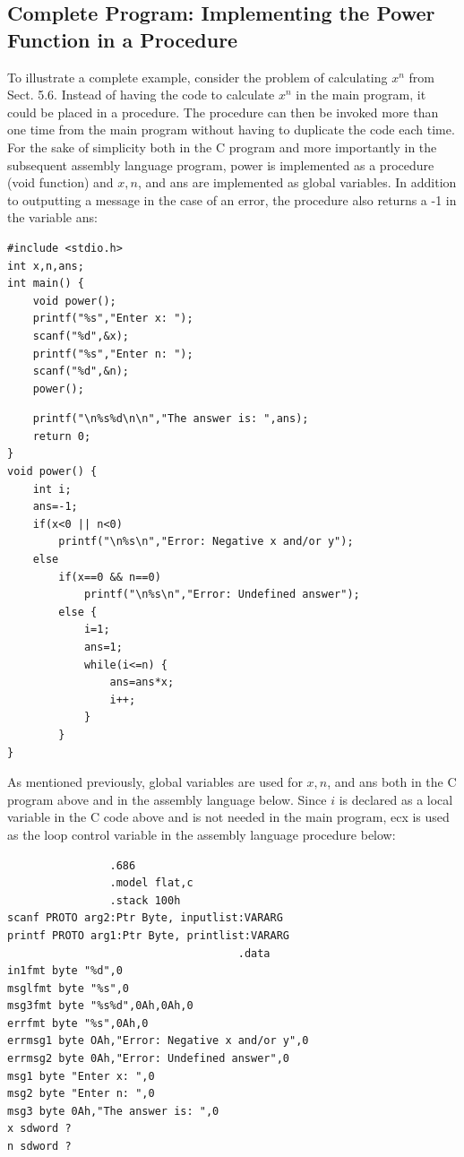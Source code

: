 \documentclass[10pt]{book}
\begin{document}
\subsection{Complete Program: Implementing the Power Function in a Procedure}
To illustrate a complete example, consider the problem of calculating $x^{n}$ from Sect. 5.6. Instead of having the code to calculate $x^{n}$ in the main program, it could be placed in a procedure. The procedure can then be invoked more than one time from the main program without having to duplicate the code each time. For the sake of simplicity both in the C program and more importantly in the subsequent assembly language program, power is implemented as a procedure (void function) and $x, n$, and ans are implemented as global variables. In addition to outputting a message in the case of an error, the procedure also returns a -1 in the variable ans:

\begin{verbatim}
#include <stdio.h>
int x,n,ans;
int main() {
    void power();
    printf("%s","Enter x: ");
    scanf("%d",&x);
    printf("%s","Enter n: ");
    scanf("%d",&n);
    power();
\end{verbatim}

\begin{verbatim}
    printf("\n%s%d\n\n","The answer is: ",ans);
    return 0;
}
void power() {
    int i;
    ans=-1;
    if(x<0 || n<0)
        printf("\n%s\n","Error: Negative x and/or y");
    else
        if(x==0 && n==0)
            printf("\n%s\n","Error: Undefined answer");
        else {
            i=1;
            ans=1;
            while(i<=n) {
                ans=ans*x;
                i++;
            }
        }
}
\end{verbatim}

As mentioned previously, global variables are used for $x, n$, and ans both in the C program above and in the assembly language below. Since $i$ is declared as a local variable in the C code above and is not needed in the main program, ecx is used as the loop control variable in the assembly language procedure below:

\begin{verbatim}
                .686
                .model flat,c
                .stack 100h
scanf PROTO arg2:Ptr Byte, inputlist:VARARG
printf PROTO arg1:Ptr Byte, printlist:VARARG
                                    .data
in1fmt byte "%d",0
msglfmt byte "%s",0
msg3fmt byte "%s%d",0Ah,0Ah,0
errfmt byte "%s",0Ah,0
errmsg1 byte OAh,"Error: Negative x and/or y",0
errmsg2 byte 0Ah,"Error: Undefined answer",0
msg1 byte "Enter x: ",0
msg2 byte "Enter n: ",0
msg3 byte 0Ah,"The answer is: ",0
x sdword ?
n sdword ?
\end{verbatim}
\end{document}
